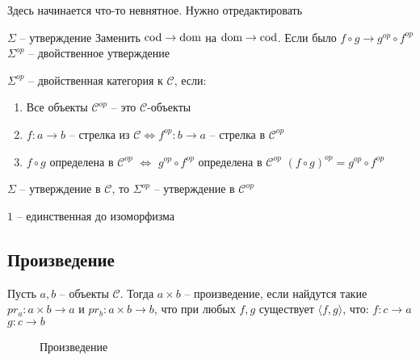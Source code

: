 Здесь начинается что-то невнятное. Нужно отредактировать

\begin{defn}
  $\Sigma$ -- утверждение
  Заменить $\operatorname{cod} \to \operatorname{dom}$ на $\operatorname{dom} \to \operatorname{cod}$. Если было
  $f \circ g \to g^{op} \circ f^{op}$
  $\Sigma^{op}$ -- двойственное утверждение
\end{defn}

\begin{defn}
  $\Sigma^{op}$ -- двойственная категория к $\mathcal{C}$, если:
  \begin{enumerate}
    \item Все объекты $\mathcal{C}^{op}$ -- это $\mathcal{C}$-объекты
    \item $f \colon a \to b$ -- стрелка из $\mathcal{C} \iff f^{op}
      \colon b \to a$ -- стрелка в $\mathcal{C}^{op}$
    \item $f \circ g$ определена в $\mathcal{C}^{op}$ $\iff$ $g^{op} \circ
      f^{op}$ определена в $\mathcal{C}^{op}$
      $(f \circ g)^{op} = g^{op} \circ f^{op}$
  \end{enumerate}
\end{defn}

\begin{task}
  $\Sigma$ -- утверждение в $\mathcal{C}$, то $\Sigma^{op}$ -- утверждение в $\mathcal{C}^{op}$
\end{task}

\begin{task}
  $1$ -- единственная до изоморфизма
\end{task}

\subsection{Произведение}
Пусть $a, b$ -- объекты $\mathcal{C}$. Тогда $a \times b$ -- произведение, если
найдутся такие $pr_a \colon a \times b \to a$ и $pr_b \colon a \times b \to b$,
что при любых $f, g$ существует $\langle f, g \rangle$, что:
$f \colon c \to a$
$g \colon c \to b$

\begin{figure}[h]
  \centering
  
  \caption{Произведение}
  \label{fig:multiplication}
\end{figure}


